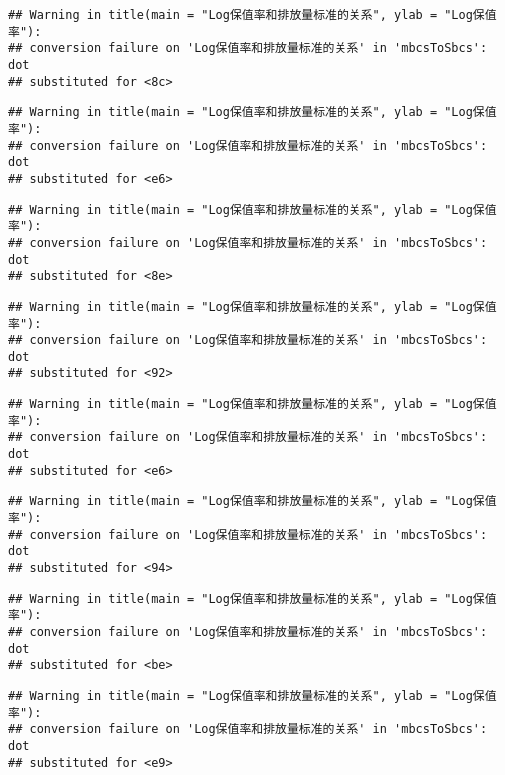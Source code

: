 \documentclass[]{article}
\begin{document}
\begin{verbatim}
## Warning in title(main = "Log保值率和排放量标准的关系", ylab = "Log保值率"):
## conversion failure on 'Log保值率和排放量标准的关系' in 'mbcsToSbcs': dot
## substituted for <8c>
\end{verbatim}

\begin{verbatim}
## Warning in title(main = "Log保值率和排放量标准的关系", ylab = "Log保值率"):
## conversion failure on 'Log保值率和排放量标准的关系' in 'mbcsToSbcs': dot
## substituted for <e6>
\end{verbatim}

\begin{verbatim}
## Warning in title(main = "Log保值率和排放量标准的关系", ylab = "Log保值率"):
## conversion failure on 'Log保值率和排放量标准的关系' in 'mbcsToSbcs': dot
## substituted for <8e>
\end{verbatim}

\begin{verbatim}
## Warning in title(main = "Log保值率和排放量标准的关系", ylab = "Log保值率"):
## conversion failure on 'Log保值率和排放量标准的关系' in 'mbcsToSbcs': dot
## substituted for <92>
\end{verbatim}

\begin{verbatim}
## Warning in title(main = "Log保值率和排放量标准的关系", ylab = "Log保值率"):
## conversion failure on 'Log保值率和排放量标准的关系' in 'mbcsToSbcs': dot
## substituted for <e6>
\end{verbatim}

\begin{verbatim}
## Warning in title(main = "Log保值率和排放量标准的关系", ylab = "Log保值率"):
## conversion failure on 'Log保值率和排放量标准的关系' in 'mbcsToSbcs': dot
## substituted for <94>
\end{verbatim}

\begin{verbatim}
## Warning in title(main = "Log保值率和排放量标准的关系", ylab = "Log保值率"):
## conversion failure on 'Log保值率和排放量标准的关系' in 'mbcsToSbcs': dot
## substituted for <be>
\end{verbatim}

\begin{verbatim}
## Warning in title(main = "Log保值率和排放量标准的关系", ylab = "Log保值率"):
## conversion failure on 'Log保值率和排放量标准的关系' in 'mbcsToSbcs': dot
## substituted for <e9>
\end{verbatim}
\end{document}
